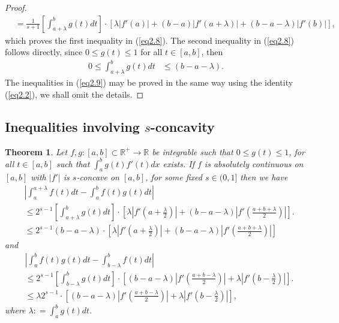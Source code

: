 \documentclass{amsart}
\newtheorem{theorem}{Theorem}
\theoremstyle{plain}
\numberwithin{equation}{section}
\begin{document}
\begin{proof}
\begin{align*}
&= \frac{1}{{s + 1}}\left[ {\int_{a + \lambda }^b {g\left( t
\right)dt}} \right] \cdot\left[ {\lambda \left| {f'\left( a
\right)} \right| + \left( {b - a} \right)\left| {f'\left( {a +
\lambda } \right)} \right| + \left( {b - a - \lambda }
\right)\left| {f'\left( b \right)} \right|} \right],
\end{align*}
which proves the first inequality in (\ref{eq2.8}). The second
inequality in (\ref{eq2.8}) follows directly, since $0 \le g(t)
\le 1$ for all $t \in [a,b]$, then
\begin{align*}
0 \le \int_{a + \lambda }^b {g\left( t \right)dt} &\le \left( {b -
a - \lambda } \right).
\end{align*}
The inequalities in (\ref{eq2.9}) may be proved in the same way
using the identity (\ref{eq2.2}), we shall omit the details.
\end{proof}


\subsection{Inequalities involving $s$-concavity}
\begin{theorem}
\label{thm5}Let $f,g: [a,b]\subset \mathbb{R}^{+} \to \mathbb{R}$
be integrable such that $0 \le g(t) \le 1$, for all $t \in [a,b]$
such that $\int_a^b {g\left( t \right)f'\left( t \right)dx}$
exists. If $f$ is absolutely continuous on $[a,b]$ with $|f'|$ is
$s$-concave on $[a,b]$, for some fixed $s\in (0,1]$ then we have
\begin{align}
&\left| {\int_a^{a + \lambda } {f\left( t \right)dt}  - \int_a^b
{f\left( t \right)g\left( t \right)dt} } \right|
\nonumber\\
&\le 2^{s-1}\left[ \int_{a + \lambda }^b {g\left( t \right)dt}
\right]\cdot \left[ {\lambda\left| {f'\left( {a + \frac{\lambda
}{2}} \right)} \right| + \left( {b - a - \lambda} \right)\left|
{f'\left( {\frac{{a + b + \lambda }}{2}} \right)} \right|}
\right]. \label{eq2.10}
\\
&\le 2^{s-1}\left( {b - a - \lambda} \right)\cdot \left[
{\lambda\left| {f'\left( {a + \frac{\lambda }{2}} \right)} \right|
+ \left( {b - a - \lambda} \right)\left| {f'\left( {\frac{{a + b +
\lambda }}{2}} \right)} \right|} \right] \nonumber
\end{align}
and
\begin{align}
&\left| {\int_a^b {f\left( t \right)g\left( t \right)dt}-\int_{b -
\lambda }^b {f\left( t \right)dt}} \right|
\nonumber\\
&\le 2^{s-1}\left[ \int_{b - \lambda }^b {g\left( t \right)dt}
\right]\cdot \left[ { \left( {b - a - \lambda} \right)\left|
{f'\left( {\frac{{a + b - \lambda }}{2}} \right)} \right| +
\lambda\left| {f'\left( {b - \frac{\lambda }{2}} \right)} \right|
} \right]. \label{eq2.11}
\\
&\le \lambda 2^{s-1}\cdot \left[ { \left( {b - a - \lambda}
\right)\left| {f'\left( {\frac{{a + b - \lambda }}{2}} \right)}
\right| + \lambda\left| {f'\left( {b - \frac{\lambda }{2}}
\right)} \right| } \right], \nonumber
\end{align}
where $\lambda : = \int_a^b {g\left( t \right)dt}$.
\end{theorem}
\end{document}
